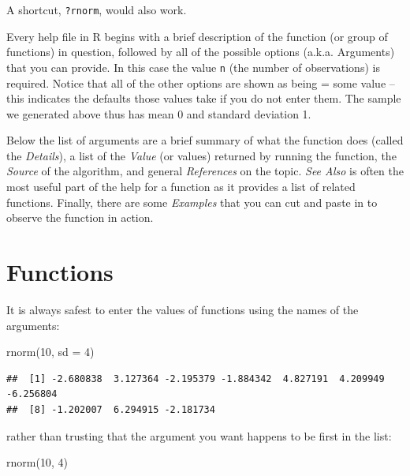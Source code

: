\documentclass[
]{book}
\newenvironment{Shaded}{\begin{snugshade}}{\end{snugshade}}
\newcommand{\AttributeTok}[1]{\textcolor[rgb]{0.77,0.63,0.00}{#1}}
\newcommand{\DecValTok}[1]{\textcolor[rgb]{0.00,0.00,0.81}{#1}}
\newcommand{\FunctionTok}[1]{\textcolor[rgb]{0.00,0.00,0.00}{#1}}
\newcommand{\NormalTok}[1]{#1}
\begin{document}
A shortcut, \texttt{?rnorm}, would also work.

Every help file in R begins with a brief description of the function (or group of functions) in question, followed by all of the possible options (a.k.a. Arguments) that you can provide. In this case the value \texttt{n} (the number of observations) is required. Notice that all of the other options are shown as being = some value -- this indicates the defaults those values take if you do not enter them. The sample we generated above thus has mean 0 and standard deviation 1.

Below the list of arguments are a brief summary of what the function does (called the \emph{Details}), a list of the \emph{Value} (or values) returned by running the function, the \emph{Source} of the algorithm, and general \emph{References} on the topic. \emph{See Also} is often the most useful part of the help for a function as it provides a list of related functions. Finally, there are some \emph{Examples} that you can cut and paste in to observe the function in action.

\hypertarget{functions}{%
\section{Functions}\label{functions}}

It is always safest to enter the values of functions using the names of the arguments:

\begin{Shaded}
\begin{Highlighting}[]
\FunctionTok{rnorm}\NormalTok{(}\DecValTok{10}\NormalTok{, }\AttributeTok{sd =} \DecValTok{4}\NormalTok{)}
\end{Highlighting}
\end{Shaded}

\begin{verbatim}
##  [1] -2.680838  3.127364 -2.195379 -1.884342  4.827191  4.209949 -6.256804
##  [8] -1.202007  6.294915 -2.181734
\end{verbatim}

rather than trusting that the argument you want happens to be first in the list:

\begin{Shaded}
\begin{Highlighting}[]
\FunctionTok{rnorm}\NormalTok{(}\DecValTok{10}\NormalTok{, }\DecValTok{4}\NormalTok{)}
\end{Highlighting}
\end{Shaded}
\end{document}
